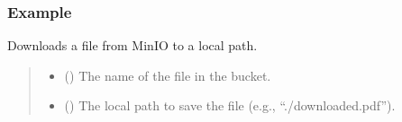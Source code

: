 \documentclass[letterpaper,10pt,english]{sphinxmanual}
\begin{document}
\begin{fulllineitems}
\begin{fulllineitems}
\begin{quote}
\begin{description}
\end{description}\end{quote}
\subsubsection*{Example}

\begin{sphinxVerbatim}[commandchars=\\\{\}]
  
\end{sphinxVerbatim}

\end{fulllineitems}


\begin{fulllineitems}
\label{\detokenize{src:src.db_utils.minio.MinioFileSystem.download_file}}
\pysigstartsignatures
{}
\pysigstopsignatures
\sphinxAtStartPar
Downloads a file from MinIO to a local path.
\begin{quote}\begin{description}
\begin{itemize}
\item {} 
\sphinxAtStartPar
{} () \textendash{} The name of the file in the bucket.

\item {} 
\sphinxAtStartPar
{} () \textendash{} The local path to save the file (e.g., “./downloaded.pdf”).

\end{itemize}


\end{description}
\end{quote}
\end{fulllineitems}
\end{fulllineitems}
\end{document}
